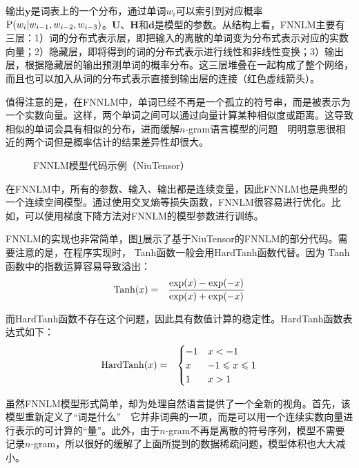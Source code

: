 \parinterval  输出$ \mathbf y $是词表上的一个分布，通过单词$ w_i $可以索引到对应概率$ {\rm P}(w_i|w_{i-1},w_{i-2},\\w_{i-3}) $。$ \mathbf U $、$ \mathbf H $和$ \mathbf d $是模型的参数。从结构上看，FNNLM主要有三层：1）词的分布式表示层，即把输入的离散的单词变为分布式表示对应的实数向量；2）隐藏层，即将得到的词的分布式表示进行线性和非线性变换；3）输出层，根据隐藏层的输出预测单词的概率分布。这三层堆叠在一起构成了整个网络，而且也可以加入从词的分布式表示直接到输出层的连接（红色虚线箭头）。

\parinterval  值得注意的是，在FNNLM中，单词已经不再是一个孤立的符号串，而是被表示为一个实数向量。这样，两个单词之间可以通过向量计算某种相似度或距离。这导致相似的单词会具有相似的分布，进而缓解$n$-gram语言模型的问题\ \dash \ 明明意思很相近的两个词但是概率估计的结果差异性却很大。

\begin{figure}[htp]
\centering

\caption{FNNLM模型代码示例（NiuTensor）}
\label{fig:5-61}
\end{figure}

\parinterval  在FNNLM中，所有的参数、输入、输出都是连续变量，因此FNNLM也是典型的一个连续空间模型。通过使用交叉熵等损失函数，FNNLM很容易进行优化。比如，可以使用梯度下降方法对FNNLM的模型参数进行训练。

\parinterval  FNNLM的实现也非常简单，图\ref{fig:5-61}展示了基于NiuTensor的FNNLM的部分代码。需要注意的是，在程序实现时， Tanh函数一般会用HardTanh函数代替。因为 Tanh函数中的指数运算容易导致溢出：
\begin{eqnarray}
{\rm{Tanh}}(x)&=&\frac{{\rm{exp}}(x)-{\rm{exp}}(-x)}{{\rm{exp}}(x)+{\rm{exp}}(-x)}
\label{}
\end{eqnarray}

\noindent 而HardTanh函数不存在这个问题，因此具有数值计算的稳定性。HardTanh函数表达式如下：
\begin{eqnarray}
{\rm{HardTanh}}(x)&=&\begin{cases} -1 & x<-1\\x & -1\leqslant x\leqslant 1\\1 & x>1\end{cases}
\label{}
\end{eqnarray}

\parinterval  虽然FNNLM模型形式简单，却为处理自然语言提供了一个全新的视角。首先，该模型重新定义了``词是什么''\ \dash \ 它并非词典的一项，而是可以用一个连续实数向量进行表示的可计算的``量''。此外，由于$n$-gram不再是离散的符号序列，模型不需要记录$n$-gram，所以很好的缓解了上面所提到的数据稀疏问题，模型体积也大大减小。

